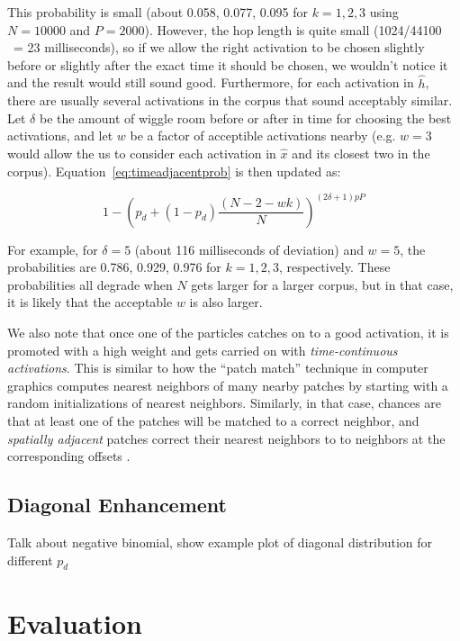 \documentclass{article}
\begin{document}
This probability is small (about 0.058, 0.077, 0.095 for $k = 1, 2, 3$ using $N=10000$ and $P=2000$).  However, the hop length is quite small (1024/44100 ~= 23 milliseconds), so if we allow the right activation to be chosen slightly before or slightly after the exact time it should be chosen, we wouldn't notice it and the result would still sound good.  Furthermore, for each activation in $\hat{h}$, there are usually several activations in the corpus that sound acceptably similar.  Let $\delta$ be the amount of wiggle room before or after in time for choosing the best activations, and let $w$ be a factor of acceptible activations nearby (e.g. $w=3$ would allow the us to consider each activation in $\hat{x}$ and its closest two in the corpus).  Equation~\ref{eq:timeadjacentprob} is then updated as:

\begin{equation}
    \label{eq:timeadjacentprobmodified}
    1 - \left( p_d + (1-p_d) \frac{(N-2-wk)}{N} \right)^{(2 \delta +1)pP}
\end{equation}

For example, for $\delta=5$ (about 116 milliseconds of deviation) and $w = 5$, the probabilities are 0.786, 0.929, 0.976 for $k=1, 2, 3$, respectively.  These probabilities all degrade when $N$ gets larger for a larger corpus, but in that case, it is likely that the acceptable $w$ is also larger.

We also note that once one of the particles catches on to a good activation, it is promoted with a high weight and gets carried on with {\em time-continuous activations}.  This is similar to how the ``patch match'' technique in computer graphics \cite{Barnes:2009:PAR, Barnes:2010:TGP} computes nearest neighbors of many nearby patches by starting with a random initializations of nearest neighbors.  Similarly, in that case, chances are that at least one of the patches will be matched to a correct neighbor, and {\em spatially adjacent} patches correct their nearest neighbors to to neighbors at the corresponding offsets \cite{Barnes:2009:PAR}.

\subsection{Diagonal Enhancement}

Talk about negative binomial, show example plot of diagonal distribution for different $p_d$


\section{Evaluation}
\end{document}

